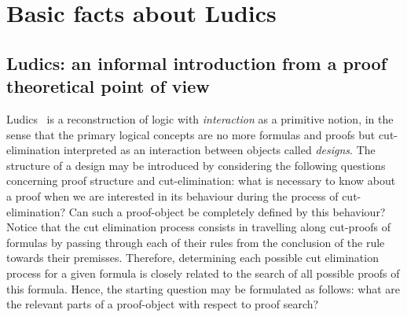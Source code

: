 \documentclass{LMCS}
\begin{document}
\section{Basic facts about Ludics}\label{sec:Ludics}
\subsection{Ludics: an informal introduction from a proof theoretical point of view} 
Ludics~\cite{DBLP:journals/mscs/Girard01} is a reconstruction of logic with {\em interaction} as a primitive notion, in the sense that the primary logical concepts  are no more formulas and proofs but cut-elimination interpreted as an interaction between objects called {\em designs}. 
The structure of a design may be introduced by considering the following questions concerning proof structure and cut-elimination: what is necessary to know about a proof when we are interested in its behaviour during the process of cut-elimination? Can such a proof-object be completely defined by this behaviour? 
Notice that the cut elimination process consists in travelling
along cut-proofs of formulas by passing through each of their rules from the conclusion of the rule towards
their premisses. Therefore, determining each possible cut elimination process for a given formula is closely related to the search of all possible proofs of this formula. Hence,
 the starting question may be formulated as follows: what are the relevant parts of a proof-object with respect to proof search?

\newcommand{\xlong}{2.5}
\newcommand{\ylong}{.8}
\newcommand{\along}{.2}
\end{document}
